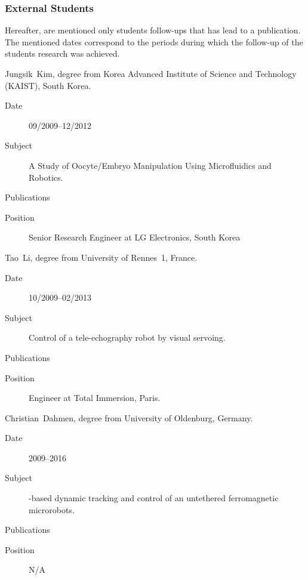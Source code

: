 \SkipAndBreak

\subsubsection{External Students}
Hereafter, are mentioned only students follow-ups that has lead to a publication.
The mentioned dates correspond to the periods during which the follow-up of the students research was achieved.

\begin{enumerate}[leftmargin=3em,format={\sffamily\bfseries\smaller\color{blue2}},label={[EXT\arabic*]}]
  \item{}\textsf{Jungsik~Kim}, \PhD degree from Korea Advanced Institute of Science and Technology (KAIST), South Korea.
  \begin{description}
    \item[Date] 09/2009--12/2012 
    \item[Subject] A Study of Oocyte/Embryo Manipulation Using Microfluidics and Robotics.
    \item[Publications] \cite{2011_icra_kim,2012_tase_kim}
    \item[Position] Senior Research Engineer at LG Electronics, South Korea
  \end{description}
  
  \SkipAndBreak
  \item{}\textsf{Tao~Li}, \PhD degree from University of Rennes~1, France.
  \begin{description}
    \item[Date] 10/2009--02/2013 
    \item[Subject]Control of a tele-echography robot by visual servoing.
    \item[Publications] \cite{2014_isj_tao}
    \item[Position] Engineer at Total Immersion, Paris.
  \end{description}
  
  \SkipAndBreak
  \item{}\textsf{Christian~Dahmen}, \PhD degree from  University of Oldenburg, Germany.
  \begin{description}
    \item[Date] 2009--2016 
    \item[Subject]\MRI-based dynamic tracking and control of an untethered ferromagnetic microrobots.
    \item[Publications] \cite{2011_iros_folio,2012_iros_dahmen,2016_ijo_folio}
    \item[Position] N/A
  \end{description}
  \medskip
  

\end{enumerate}
